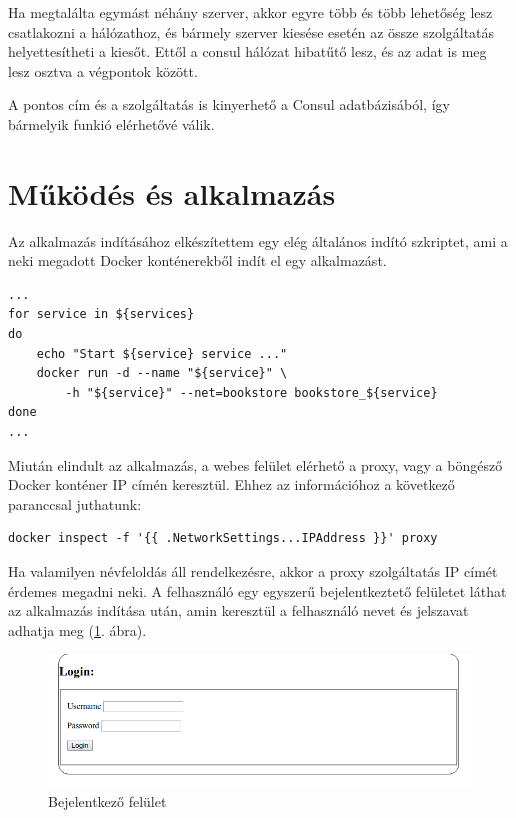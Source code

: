 \documentclass[11pt,magyar,a4paper,twoside,]{report}
\let\Oldincludegraphics\includegraphics
\renewcommand{\includegraphics}[1]{
\begin{adjustbox}{max size={\textwidth}{\textheight}}
    \Oldincludegraphics[scale=0.6]{#1}%
\end{adjustbox}
}
\begin{document}
Ha megtalálta egymást néhány szerver, akkor egyre több és több lehetőség
lesz csatlakozni a hálózathoz, és bármely szerver kiesése esetén az
össze szolgáltatás helyettesítheti a kiesőt. Ettől a consul hálózat
hibatűtő lesz, és az adat is meg lesz osztva a végpontok között.

A pontos cím és a szolgáltatás is kinyerhető a Consul adatbázisából, így
bármelyik funkió elérhetővé válik.

\section{Működés és
alkalmazás}\label{mux171kuxf6duxe9s-uxe9s-alkalmazuxe1s}

Az alkalmazás indításához elkészítettem egy elég általános indító
szkriptet, ami a neki megadott Docker konténerekből indít el egy
alkalmazást.

\begin{verbatim}
...
for service in ${services}
do
    echo "Start ${service} service ..."
    docker run -d --name "${service}" \
        -h "${service}" --net=bookstore bookstore_${service}
done
...
\end{verbatim}

Miután elindult az alkalmazás, a webes felület elérhető a proxy, vagy a
böngésző Docker konténer IP címén keresztül. Ehhez az információhoz a
következő paranccsal juthatunk:

\begin{verbatim}
docker inspect -f '{{ .NetworkSettings...IPAddress }}' proxy
\end{verbatim}

Ha valamilyen névfeloldás áll rendelkezésre, akkor a proxy szolgáltatás
IP címét érdemes megadni neki. A felhasználó egy egyszerű
bejelentkeztető felületet láthat az alkalmazás indítása után, amin
keresztül a felhasználó nevet és jelszavat adhatja meg (\ref{login}.
ábra).

\begin{figure}[H]
\centering
\includegraphics{img/loginscreen.png}
\caption{Bejelentkező felület\label{login}}
\end{figure}
\end{document}
